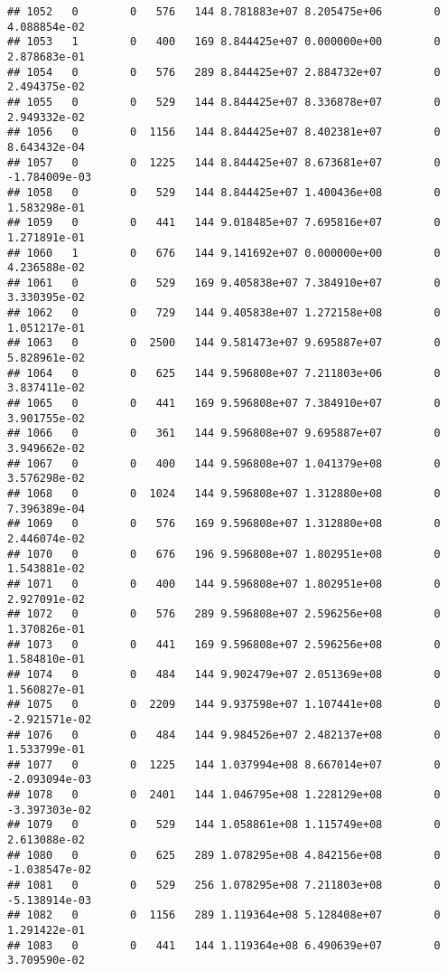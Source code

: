 \documentclass[
]{article}
\begin{document}
\begin{enumerate}
\begin{verbatim}
## 1052   0        0   576   144 8.781883e+07 8.205475e+06        0  4.088854e-02
## 1053   1        0   400   169 8.844425e+07 0.000000e+00        0  2.878683e-01
## 1054   0        0   576   289 8.844425e+07 2.884732e+07        0  2.494375e-02
## 1055   0        0   529   144 8.844425e+07 8.336878e+07        0  2.949332e-02
## 1056   0        0  1156   144 8.844425e+07 8.402381e+07        0  8.643432e-04
## 1057   0        0  1225   144 8.844425e+07 8.673681e+07        0 -1.784009e-03
## 1058   0        0   529   144 8.844425e+07 1.400436e+08        0  1.583298e-01
## 1059   0        0   441   144 9.018485e+07 7.695816e+07        0  1.271891e-01
## 1060   1        0   676   144 9.141692e+07 0.000000e+00        0  4.236588e-02
## 1061   0        0   529   169 9.405838e+07 7.384910e+07        0  3.330395e-02
## 1062   0        0   729   144 9.405838e+07 1.272158e+08        0  1.051217e-01
## 1063   0        0  2500   144 9.581473e+07 9.695887e+07        0  5.828961e-02
## 1064   0        0   625   144 9.596808e+07 7.211803e+06        0  3.837411e-02
## 1065   0        0   441   169 9.596808e+07 7.384910e+07        0  3.901755e-02
## 1066   0        0   361   144 9.596808e+07 9.695887e+07        0  3.949662e-02
## 1067   0        0   400   144 9.596808e+07 1.041379e+08        0  3.576298e-02
## 1068   0        0  1024   144 9.596808e+07 1.312880e+08        0  7.396389e-04
## 1069   0        0   576   169 9.596808e+07 1.312880e+08        0  2.446074e-02
## 1070   0        0   676   196 9.596808e+07 1.802951e+08        0  1.543881e-02
## 1071   0        0   400   144 9.596808e+07 1.802951e+08        0  2.927091e-02
## 1072   0        0   576   289 9.596808e+07 2.596256e+08        0  1.370826e-01
## 1073   0        0   441   169 9.596808e+07 2.596256e+08        0  1.584810e-01
## 1074   0        0   484   144 9.902479e+07 2.051369e+08        0  1.560827e-01
## 1075   0        0  2209   144 9.937598e+07 1.107441e+08        0 -2.921571e-02
## 1076   0        0   484   144 9.984526e+07 2.482137e+08        0  1.533799e-01
## 1077   0        0  1225   144 1.037994e+08 8.667014e+07        0 -2.093094e-03
## 1078   0        0  2401   144 1.046795e+08 1.228129e+08        0 -3.397303e-02
## 1079   0        0   529   144 1.058861e+08 1.115749e+08        0  2.613088e-02
## 1080   0        0   625   289 1.078295e+08 4.842156e+08        0 -1.038547e-02
## 1081   0        0   529   256 1.078295e+08 7.211803e+08        0 -5.138914e-03
## 1082   0        0  1156   289 1.119364e+08 5.128408e+07        0  1.291422e-01
## 1083   0        0   441   144 1.119364e+08 6.490639e+07        0  3.709590e-02

\end{verbatim}
\end{enumerate}
\end{document}
